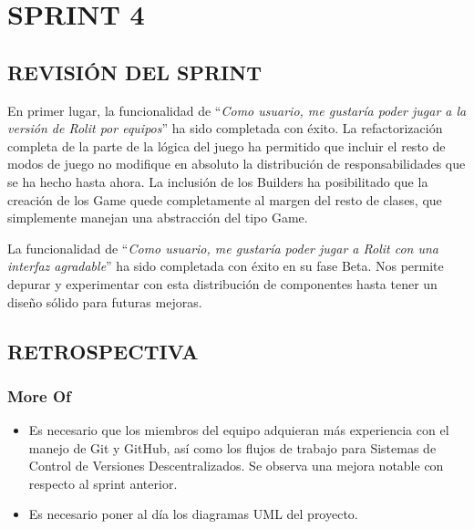 \documentclass[../../SCRUM.tex]{subfiles}
\begin{document}
\section{SPRINT 4}
\subsection{REVISIÓN DEL SPRINT}
En primer lugar, la funcionalidad de ``\textit{Como usuario, me gustaría poder jugar a la versión de Rolit por equipos}'' ha sido completada con éxito. La refactorización completa de la parte de la lógica del juego ha permitido que incluir el resto de modos de juego no modifique en absoluto la distribución de responsabilidades que se ha hecho hasta ahora. La inclusión de los Builders ha posibilitado que la creación de los Game quede completamente al margen del resto de clases, que simplemente manejan una abstracción del tipo Game.

La funcionalidad de ``\textit{Como usuario, me gustaría poder jugar a Rolit con una interfaz agradable}'' ha sido completada con éxito en su fase Beta. Nos permite depurar y experimentar con esta distribución de componentes hasta tener un diseño sólido para futuras mejoras.

\subsection{RETROSPECTIVA}
\subsubsection{More Of}
\begin{itemize}
\item Es necesario que los miembros del equipo adquieran más experiencia con el manejo de Git y GitHub, así como los flujos de trabajo para Sistemas de Control de Versiones Descentralizados. Se observa una mejora notable con respecto al sprint anterior.

\item Es necesario poner al día los diagramas UML del proyecto.

\end{itemize}
\end{document}
